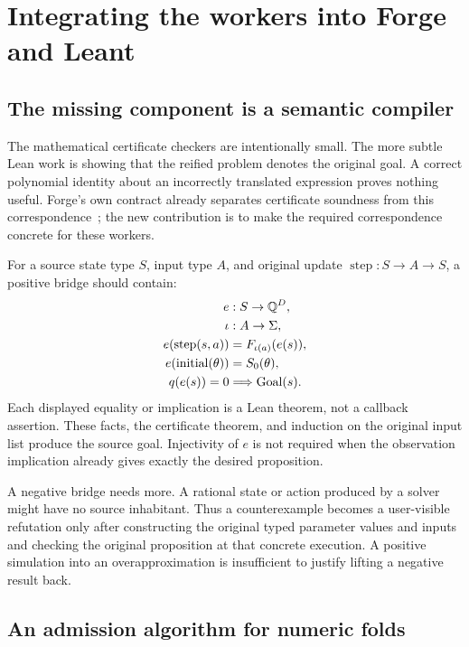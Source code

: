 \section{Integrating the workers into Forge and Leant}
\label{sec:integration}

\subsection{The missing component is a semantic compiler}

The mathematical certificate checkers are intentionally small. The more subtle
Lean work is showing that the reified problem denotes the original goal. A
correct polynomial identity about an incorrectly translated expression proves
nothing useful. Forge's own contract already separates certificate soundness
from this correspondence~\cite{forge-contracts}; the new contribution is to
make the required correspondence concrete for these workers.

For a source state type $S$, input type $A$, and original update
$\operatorname{step}:S\to A\to S$, a positive bridge should contain:
\begin{align*}
 e &: S\to\mathbb Q^D,\\
 \iota &: A\to\Sigma,\\
 e(\operatorname{step}(s,a))&=F_{\iota(a)}(e(s)),\\
 e(\operatorname{initial}(\theta))&=S_0(\theta),\\
 q(e(s))=0&\Longrightarrow \operatorname{Goal}(s).
\end{align*}
Each displayed equality or implication is a Lean theorem, not a callback
assertion. These facts, the certificate theorem, and induction on the original
input list produce the source goal. Injectivity of $e$ is not required when the
observation implication already gives exactly the desired proposition.

A negative bridge needs more. A rational state or action produced by a solver
might have no source inhabitant. Thus a counterexample becomes a user-visible
refutation only after constructing the original typed parameter values and
inputs and checking the original proposition at that concrete execution. A
positive simulation into an overapproximation is insufficient to justify
lifting a negative result back.

\subsection{An admission algorithm for numeric folds}

